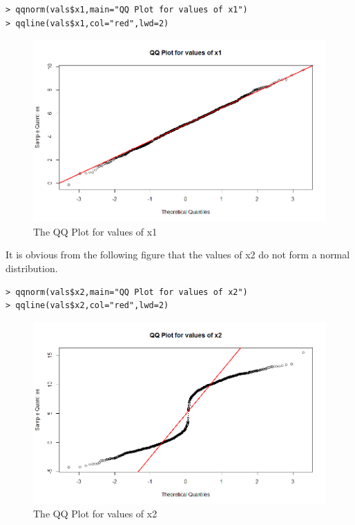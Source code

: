 \documentclass[fontsize=10pt]{scrartcl}
\begin{document}
\begin{enumerate}
\begin{verbatim}
> qqnorm(vals$x1,main="QQ Plot for values of x1")
> qqline(vals$x1,col="red",lwd=2)
\end{verbatim}
		\begin{figure}[H]
			\begin{center}
				\includegraphics[scale=.5]{resources/qqplot_1.png}
				\caption{The QQ Plot for values of x1}
			\end{center}
		\end{figure}

		It is obvious from the following figure that the values of x2 do not form a normal distribution.
\begin{verbatim}
> qqnorm(vals$x2,main="QQ Plot for values of x2")
> qqline(vals$x2,col="red",lwd=2)
\end{verbatim}
		\begin{figure}[H]
			\begin{center}
				\includegraphics[scale=.5]{resources/qqplot_2.png}
				\caption{The QQ Plot for values of x2}
			\end{center}
		\end{figure}


\end{enumerate}
\end{document}
